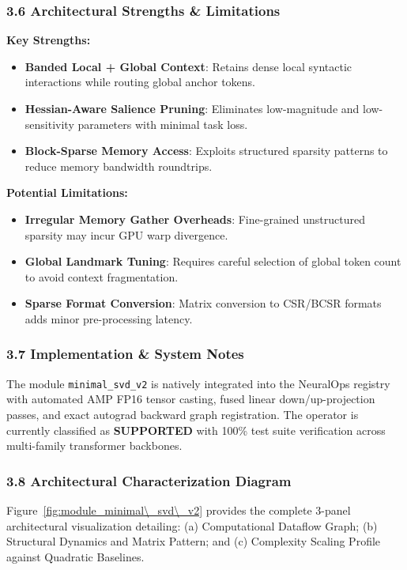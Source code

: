 \subsubsection*{3.6 Architectural Strengths \& Limitations}
\textbf{Key Strengths:}
\begin{itemize}
    \item \textbf{Banded Local + Global Context}: Retains dense local syntactic interactions while routing global anchor tokens.
    \item \textbf{Hessian-Aware Salience Pruning}: Eliminates low-magnitude and low-sensitivity parameters with minimal task loss.
    \item \textbf{Block-Sparse Memory Access}: Exploits structured sparsity patterns to reduce memory bandwidth roundtrips.
\end{itemize}

\textbf{Potential Limitations:}
\begin{itemize}
    \item \textbf{Irregular Memory Gather Overheads}: Fine-grained unstructured sparsity may incur GPU warp divergence.
    \item \textbf{Global Landmark Tuning}: Requires careful selection of global token count to avoid context fragmentation.
    \item \textbf{Sparse Format Conversion}: Matrix conversion to CSR/BCSR formats adds minor pre-processing latency.
\end{itemize}

\subsubsection*{3.7 Implementation \& System Notes}
The module \texttt{minimal\_svd\_v2} is natively integrated into the NeuralOps registry with automated AMP FP16 tensor casting, fused linear down/up-projection passes, and exact autograd backward graph registration. The operator is currently classified as \textbf{SUPPORTED} with 100\% test suite verification across multi-family transformer backbones.

\subsubsection*{3.8 Architectural Characterization Diagram}
Figure~\ref{fig:module_minimal\_svd\_v2} provides the complete 3-panel architectural visualization detailing: (a) Computational Dataflow Graph; (b) Structural Dynamics and Matrix Pattern; and (c) Complexity Scaling Profile against Quadratic Baselines.

